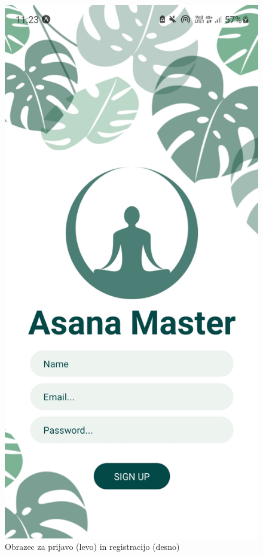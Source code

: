 \documentclass[a4paper, 12pt]{book}
\begin{document}
\begin{figure}[!tbp]
\begin{minipage}[b]{0.35\textwidth}
    \label{prijava}
  \end{minipage}
  \begin{minipage}[b]{0.35\textwidth}
    \includegraphics[width=\textwidth]{registracija.jpg}\centering
  \end{minipage}
    \caption{Obrazec za prijavo (levo) in registracijo (desno)}


\end{figure}
\end{document}
